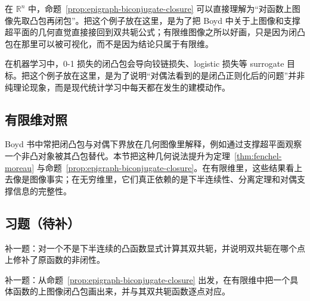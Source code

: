 \begin{example}[有限维上图像闭凸包]
在 $\mathbb R^n$ 中，命题~\ref{prop:epigraph-biconjugate-closure} 可以直接理解为“对函数上图像先取凸包再闭包”。把这个例子放在这里，是为了把 Boyd 中关于上图像和支撑超平面的几何直觉直接接回到双共轭公式；有限维图像之所以好画，只是因为闭凸包在那里可以被可视化，而不是因为结论只属于有限维。
\end{example}

\begin{example}[替代损失与闭凸正则化]
在机器学习中，0-1 损失的闭凸包会导向铰链损失、logistic 损失等 surrogate 目标。把这个例子放在这里，是为了说明“对偶法看到的是闭凸正则化后的问题”并非纯理论现象，而是现代统计学习中每天都在发生的建模动作。
\end{example}

\subsection*{有限维对照}

Boyd 书中常把闭凸包与对偶下界放在几何图像里解释，例如通过支撑超平面观察一个非凸对象被其凸包替代。本节把这种几何说法提升为定理~\ref{thm:fenchel-moreau} 与命题~\ref{prop:epigraph-biconjugate-closure}。在有限维里，这些结果看上去像是图像事实；在无穷维里，它们真正依赖的是下半连续性、分离定理和对偶支撑信息的完整性。

\subsection*{习题（待补）}

\begin{exercise}[双共轭桥接题占位]\label{exr:biconjugate-placeholder}
补一题：对一个不是下半连续的凸函数显式计算其双共轭，并说明双共轭在哪个点上修补了原函数的非闭性。
\end{exercise}

\begin{exercise}[闭凸包占位]\label{exr:epigraph-closure-placeholder}
补一题：从命题~\ref{prop:epigraph-biconjugate-closure} 出发，在有限维中把一个具体函数的上图像闭凸包画出来，并与其双共轭函数逐点对应。
\end{exercise}

